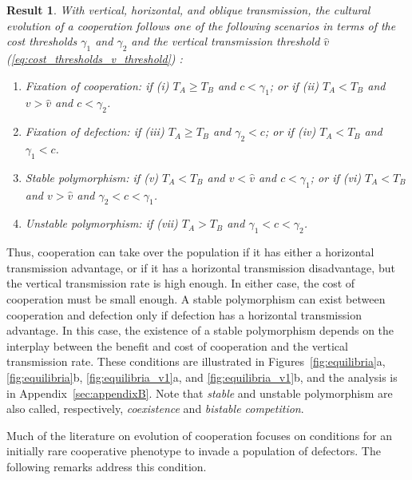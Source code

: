 \documentclass[12pt]{extarticle}
\newtheorem{result}{Result}
\begin{document}
\begin{result}%
\label{result:vert_obli_hori}
With vertical, horizontal, and oblique transmission, the cultural evolution of a cooperation follows one of the following scenarios in terms of the cost thresholds $\gamma_1$ and $\gamma_2$ and the vertical transmission threshold $\hat v$ (\autoref{eq:cost_thresholds_v_threshold}) :

\begin{enumerate}
\item \emph{Fixation of cooperation}: 
	if \emph{(i)} $T_A \ge T_B$ and $c < \gamma_1$; or 
	if \emph{(ii)} $T_A < T_B$ and $v>\hat v$ and $c < \gamma_2$.
\item \emph{Fixation of defection}: 
    if \emph{(iii)} $T_A \ge T_B$ and $\gamma_2 < c$; or 
	if \emph{(iv)} $T_A < T_B$ and $\gamma_1 < c$.
\item \emph{Stable polymorphism}: 
    if \emph{(v)} $T_A < T_B$ and $v<\hat{v}$ and $c < \gamma_1$; or 
    if \emph{(vi)} $T_A < T_B$ and $v>\hat{v}$ and $\gamma_2 < c < \gamma_1$.
\item \emph{Unstable polymorphism}:
    if \emph{(vii)} $T_A > T_B$ and $\gamma_1 < c < \gamma_2$.
\end{enumerate}

\end{result}
Thus, cooperation can take over the population if it has either a horizontal transmission advantage, or if it has a horizontal transmission disadvantage, but the vertical transmission rate is high enough.
In either case, the cost of cooperation must be small enough.
A stable polymorphism can exist between cooperation and defection only if defection has a horizontal transmission advantage.
In this case, the existence of a stable polymorphism depends on the interplay between the benefit and cost of cooperation and the vertical transmission rate.
These conditions are illustrated in Figures~\ref{fig:equilibria}a, \ref{fig:equilibria}b, \ref{fig:equilibria_v1}a, and \ref{fig:equilibria_v1}b, and the analysis is in Appendix~\ref{sec:appendixB}.
Note that \emph{stable} and {unstable polymorphism} are also called, respectively, \emph{coexistence} and \emph{bistable competition}.

Much of the literature on evolution of cooperation focuses on conditions for  an initially rare cooperative phenotype to invade a population of defectors.
The following remarks address this condition.
\\
\end{document}
